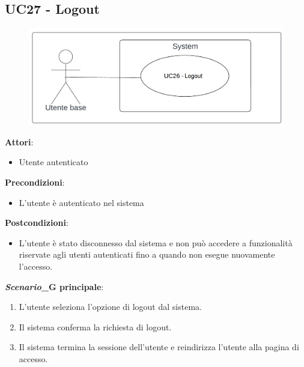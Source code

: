 \subsection{UC27 - Logout}\label{usecase:27}
\begin{figure}[H]
\centering
\includegraphics[width=0.75\linewidth]{ucd/UCD27.png}
\end{figure}
\textbf{Attori}:
\begin{itemize}
    \item Utente autenticato
\end{itemize}
\textbf{Precondizioni}:
\begin{itemize}
    \item L'utente è autenticato nel sistema
\end{itemize}
\textbf{Postcondizioni}:
\begin{itemize}
    \item L'utente è stato disconnesso dal sistema e non può accedere a funzionalità riservate agli utenti autenticati fino a quando non esegue nuovamente l'accesso.
\end{itemize}
\textbf{\textit{Scenario}_G principale}:
\begin{enumerate}
    \item L'utente seleziona l'opzione di logout dal sistema.
    \item Il sistema conferma la richiesta di logout.
    \item Il sistema termina la sessione dell'utente e reindirizza l'utente alla pagina di accesso.
\end{enumerate}

\newpage